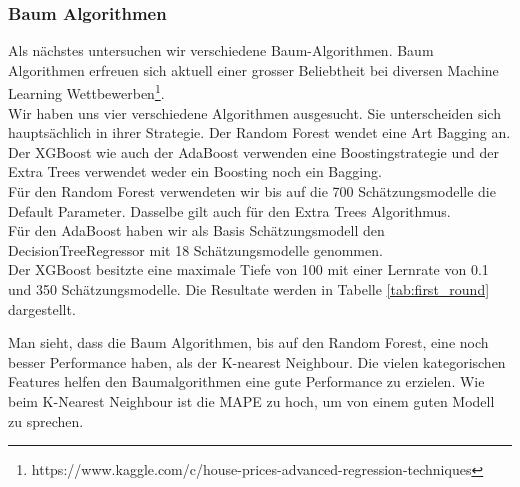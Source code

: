 \subsubsection{Baum Algorithmen}
Als nächstes untersuchen wir verschiedene Baum-Algorithmen. Baum Algorithmen erfreuen sich aktuell einer grosser Beliebtheit bei diversen Machine Learning Wettbewerben\footnote{https://www.kaggle.com/c/house-prices-advanced-regression-techniques}.\\[2ex]
%
Wir haben uns vier verschiedene Algorithmen ausgesucht. Sie unterscheiden sich hauptsächlich in ihrer Strategie. Der Random Forest wendet eine Art Bagging an. Der XGBoost wie auch der AdaBoost verwenden eine Boostingstrategie und der Extra Trees verwendet weder ein Boosting noch ein Bagging.\\
Für den Random Forest verwendeten wir bis auf die 700 Schätzungsmodelle die Default Parameter. Dasselbe gilt auch für den Extra Trees Algorithmus.\\
Für den AdaBoost haben wir als Basis Schätzungsmodell den DecisionTreeRegressor mit 18 Schätzungsmodelle genommen.\\
Der XGBoost besitzte eine maximale Tiefe von 100 mit einer Lernrate von 0.1 und 350 Schätzungsmodelle.
Die Resultate werden in Tabelle \ref{tab:first_round} dargestellt.\\[2ex]
%
\begin{table}[ht]
\centering
{}
\caption{Ergebnisse der Baum Algorithmen}
\label{tab:first_round}
\end{table}
%
Man sieht, dass die Baum Algorithmen, bis auf den Random Forest, eine noch besser Performance haben, als der K-nearest Neighbour. Die vielen kategorischen Features helfen den Baumalgorithmen eine gute Performance zu erzielen. Wie beim K-Nearest Neighbour ist die MAPE zu hoch, um von einem guten Modell zu sprechen.\\[2ex]
